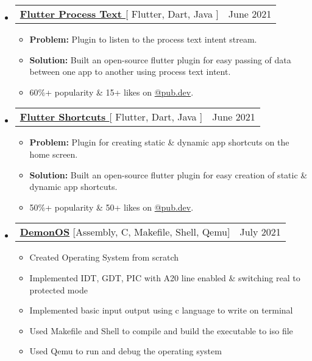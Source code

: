 \documentclass[letterpaper,11pt]{article}
\makeatletter
\newcommand{\resumeItem}[1]{
  \item\small{
    {#1 \vspace{-2pt}}
  }
}
\newcommand{\resumeProjectHeading}[2]{
    \item
    \begin{tabular*}{0.97\textwidth}{l@{\extracolsep{\fill}}r}
      \small#1 & #2 \\
    \end{tabular*}\vspace{-7pt}
}
\newcommand{\resumeSubHeadingListStart}{\begin{itemize}[leftmargin=0.15in, label={}]}
\newcommand{\resumeSubHeadingListEnd}{\end{itemize}}
\newcommand{\resumeItemListStart}{\begin{itemize}}
\newcommand{\resumeItemListEnd}{\end{itemize}\vspace{-5pt}}
\makeatother
\begin{document}
    \resumeSubHeadingListStart
      \resumeProjectHeading
          {\textbf{\href{https://pub.dev/packages/flutter_process_text}{Flutter Process Text }}{[ Flutter, Dart, Java ]}}{June 2021}
          \resumeItemListStart
           \resumeItem{\textbf{Problem:} Plugin to listen to the process text intent stream.}
           \resumeItem{\textbf{Solution:} Built an open-source flutter plugin for easy passing of data between one app to another using process text intent.}
           \resumeItem{60\%+ popularity \& 15+ likes on  \href{https://pub.dev/packages/flutter_process_text}{@pub.dev}.}
          \resumeItemListEnd
    \resumeSubHeadingListEnd

    \resumeSubHeadingListStart
      \resumeProjectHeading
          {\textbf{\href{https://pub.dev/packages/flutter_shortcuts}{Flutter Shortcuts }}{[ Flutter, Dart, Java ]}}{June 2021}
          \resumeItemListStart
           \resumeItem{\textbf{Problem:} Plugin for creating static \& dynamic app shortcuts on the home screen.}
           \resumeItem{\textbf{Solution:} Built an open-source flutter plugin for easy creation of static \& dynamic app shortcuts.}
           \resumeItem{50\%+ popularity \& 50+ likes on  \href{https://pub.dev/packages/flutter_shortcuts}{@pub.dev}.}
          \resumeItemListEnd
    \resumeSubHeadingListEnd
    
  \resumeSubHeadingListStart
      \resumeProjectHeading
          {\textbf{\href{https://github.com/divshekhar/DemonOS}{\textbf{DemonOS}}}{ [Assembly, C, Makefile, Shell, Qemu]}}{July 2021}
          \resumeItemListStart
            \resumeItem{Created Operating System from scratch}
            \resumeItem{Implemented IDT, GDT, PIC with A20 line enabled \& switching real to protected mode}
            \resumeItem{Implemented basic input output using c language to write on terminal}
            \resumeItem{Used Makefile and Shell to compile and build the executable to iso file}
            \resumeItem{Used Qemu to run and debug the operating system}
          \resumeItemListEnd
    \resumeSubHeadingListEnd
    
\end{document}
